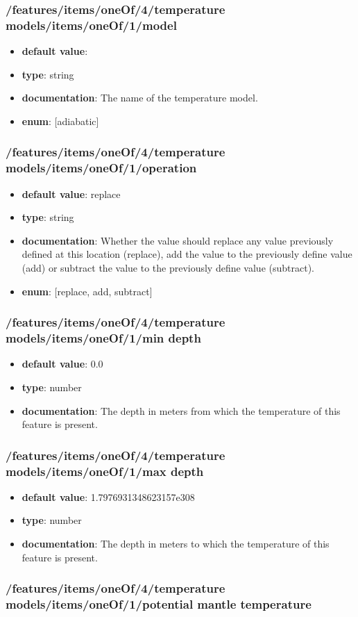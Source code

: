 \subsubsection{/features/items/oneOf/4/temperature models/items/oneOf/1/model}
\begin{itemize}\item {\bf default value}: 
\item {\bf type}: string
\item {\bf documentation}: The name of the temperature model.
\item {\bf enum}: [adiabatic]\end{itemize}\subsubsection{/features/items/oneOf/4/temperature models/items/oneOf/1/operation}
\begin{itemize}\item {\bf default value}: replace
\item {\bf type}: string
\item {\bf documentation}: Whether the value should replace any value previously defined at this location (replace), add the value to the previously define value (add) or subtract the value to the previously define value (subtract).
\item {\bf enum}: [replace, add, subtract]\end{itemize}\subsubsection{/features/items/oneOf/4/temperature models/items/oneOf/1/min depth}
\begin{itemize}\item {\bf default value}: 0.0
\item {\bf type}: number
\item {\bf documentation}: The depth in meters from which the temperature of this feature is present.
\end{itemize}\subsubsection{/features/items/oneOf/4/temperature models/items/oneOf/1/max depth}
\begin{itemize}\item {\bf default value}: 1.7976931348623157e308
\item {\bf type}: number
\item {\bf documentation}: The depth in meters to which the temperature of this feature is present.
\end{itemize}\subsubsection{/features/items/oneOf/4/temperature models/items/oneOf/1/potential mantle temperature}
